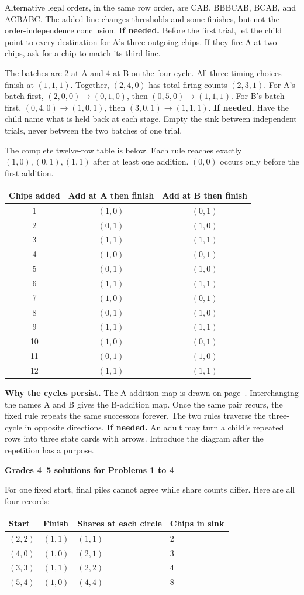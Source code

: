 \documentclass[11pt,letterpaper]{article}
\newcommand{\pagehead}[1]{{\Large\bfseries #1}\par\vspace{3pt}}
\newcommand{\prob}[2]{\par\vspace{5pt}{\large\bfseries #1}\par #2}
\newcommand{\hint}[1]{\textbf{If needed.} #1\par}
\begin{document}
Alternative legal orders, in the same row order, are CAB, BBBCAB, BCAB, and ACBABC. The added line changes thresholds and some finishes, but not the order-independence conclusion.
\hint{Before the first trial, let the child point to every destination for A's three outgoing chips. If they fire A at two chips, ask for a chip to match its third line.}
\prob{Problem 5}{The batches are 2 at A and 4 at B on the four cycle. All three timing choices finish at $(1,1,1)$. Together, $(2,4,0)$ has total firing counts $(2,3,1)$. For A's batch first, $(2,0,0)\to(0,1,0)$, then $(0,5,0)\to(1,1,1)$. For B's batch first, $(0,4,0)\to(1,0,1)$, then $(3,0,1)\to(1,1,1)$.}
\hint{Have the child name what is held back at each stage. Empty the sink between independent trials, never between the two batches of one trial.}
\prob{Problem 6}{The complete twelve-row table is below. Each rule reaches exactly $(1,0),(0,1),(1,1)$ after at least one addition. $(0,0)$ occurs only before the first addition.}
\begin{center}\begin{tabular}{ccc}\toprule
Chips added & Add at A then finish & Add at B then finish\\\midrule
1&$(1,0)$&$(0,1)$\\2&$(0,1)$&$(1,0)$\\3&$(1,1)$&$(1,1)$\\
4&$(1,0)$&$(0,1)$\\5&$(0,1)$&$(1,0)$\\6&$(1,1)$&$(1,1)$\\
7&$(1,0)$&$(0,1)$\\8&$(0,1)$&$(1,0)$\\9&$(1,1)$&$(1,1)$\\
10&$(1,0)$&$(0,1)$\\11&$(0,1)$&$(1,0)$\\12&$(1,1)$&$(1,1)$\\\bottomrule\end{tabular}\end{center}
\textbf{Why the cycles persist.} The A-addition map is drawn on page~\pageref{kcycle}. Interchanging the names A and B gives the B-addition map. Once the same pair recurs, the fixed rule repeats the same successors forever. The two rules traverse the three-cycle in opposite directions.
\hint{An adult may turn a child's repeated rows into three state cards with arrows. Introduce the diagram after the repetition has a purpose.}

\newpage
\pagehead{Grades 4--5 solutions for Problems 1 to 4}
\prob{Problem 1}{For one fixed start, final piles cannot agree while share counts differ. Here are all four records:}
\begin{center}\begin{tabular}{llll}\toprule Start & Finish & Shares at each circle & Chips in sink\\\midrule
$(2,2)$ & $(1,1)$ & $(1,1)$ & 2\\
$(4,0)$ & $(1,0)$ & $(2,1)$ & 3\\
$(3,3)$ & $(1,1)$ & $(2,2)$ & 4\\
$(5,4)$ & $(1,0)$ & $(4,4)$ & 8\\
\bottomrule\end{tabular}\end{center}
\end{document}
